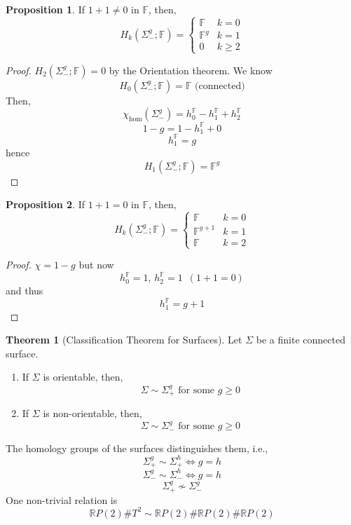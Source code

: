 \documentclass[a4paper,14pt]{extarticle}
\theoremstyle{definition}
\newtheorem*{theorem}{Theorem}
\newtheorem*{proposition}{Proposition}
\begin{document}
\begin{proposition}
	If $1+1\neq 0$ in $\mathbb{F}$, then,
	\[H_k(\Sigma_-^g;\mathbb{F})=\begin{cases}
		\mathbb{F} & k = 0 \\ \mathbb{F}^g & k = 1 \\ 0 & k \geq 2
	\end{cases}\]
\end{proposition}

\begin{proof}
	$H_2(\Sigma_-^g;\mathbb{F})=0$ by the Orientation theorem. We know 
	\[H_0(\Sigma_-^g;\mathbb{F})=\mathbb{F}\text{ (connected)}\] Then,
	\[\chi_{\text{hom}}(\Sigma_-^g)=h_0^\mathbb{F}-h_1^\mathbb{F}+h_2^\mathbb{F}\]
	\[1-g = 1 - h_1^\mathbb{F} + 0\]
	\[h_1^\mathbb{F} = g\]
	hence \[H_1(\Sigma_-^g;\mathbb{F})=\mathbb{F}^g\]
\end{proof}

\begin{proposition}
	If $1+1=0$ in $\mathbb{F}$, then,
	\[H_k(\Sigma_-^g;\mathbb{F})=\begin{cases}
		\mathbb{F} & k = 0 \\ \mathbb{F}^{g+1} & k = 1 \\ \mathbb{F} & k = 2
	\end{cases}\]
\end{proposition}

\begin{proof}
	$\chi = 1 - g$ but now 
	\[h_0^\mathbb{F} = 1, \,h_2^\mathbb{F} = 1 \,\,\,(1+1 = 0)\]
	and thus 
	\[h_1^\mathbb{F} = g + 1\]
\end{proof}

\begin{theorem}[Classification Theorem for Surfaces]
	Let $\Sigma$ be a finite connected surface.
	\begin{enumerate}
		\item If $\Sigma$ is orientable, then, 
		\[\Sigma\sim\Sigma_+^g\text{ for some }g\geq0\]
		\item If $\Sigma$ is non-orientable, then,
		\[\Sigma\sim\Sigma_-^g\text{ for some }g\geq0\]
	\end{enumerate}
\end{theorem}

\noindent The homology groups of the surfaces distinguishes them, i.e.,
\[\Sigma_+^g\sim\Sigma_+^h\iff g = h\]
\[\Sigma_-^g\sim\Sigma_-^h\iff g = h\]
\[\Sigma_+^g\not\sim\Sigma_-^g\]
One non-trivial relation is 
\[\mathbb{R}P(2)\# T^2\sim\mathbb{R}P(2)\#\mathbb{R}P(2)\#\mathbb{R}P(2)\]
\end{document}
